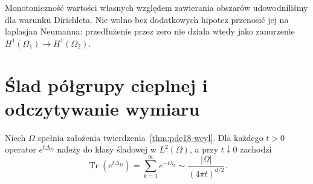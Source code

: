 \begin{uwaga}
Monotoniczność wartości własnych względem zawierania
obszarów udowodniliśmy dla warunku Dirichleta.
Nie wolno bez dodatkowych hipotez przenosić jej na
laplasjan Neumanna: przedłużenie przez zero nie działa
wtedy jako zanurzenie $H^1(\Omega_1)\to H^1(\Omega_2)$.
\end{uwaga}

\section{Ślad półgrupy cieplnej i odczytywanie wymiaru}
\label{sec:pde18-heat}
\begin{twierdzenie}
\label{thm:pde18-heat}
Niech $\Omega$ spełnia założenia
twierdzenia~\ref{thm:pde18-weyl}. Dla każdego $t>0$
operator $e^{t\Delta_D}$ należy do klasy śladowej w $L^2(\Omega)$,
a przy $t\downarrow0$ zachodzi
\begin{equation}\label{eq:pde18-heat}
 \operatorname{Tr}(e^{t\Delta_D})=
 \sum_{k=1}^\infty e^{-t\lambda_k}
 \sim\frac{|\Omega|}{(4\pi t)^{d/2}}.
\end{equation}
\end{twierdzenie}
